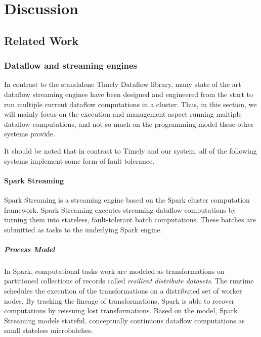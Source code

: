 \chapter{Discussion}\label{ch:discussion}

\section{Related Work}

\subsection{Dataflow and streaming engines}

In contrast to the standalone Timely Dataflow library, many state of the art
dataflow streaming engines have been designed and engineered from the start
to run multiple current dataflow computations in a cluster. Thus, in this
section, we will mainly focus on the execution and management aspect running
multiple dataflow computations, and not so much on the programming model these
other systems provide.

It should be noted that in contrast to Timely and our system, all of the
following systems implement some form of fault tolerance. 

\subsubsection{Spark Streaming}

Spark Streaming \cite{sparkstreaming} is a streaming engine based on the Spark
cluster computation framework. Spark Streaming executes streaming dataflow
computations by turning them into stateless, fault-tolerant batch computations.
These batches are submitted as tasks to the underlying Spark engine. \cite{spark} 

\paragraph{Process Model}

In Spark, computational tasks work are modeled as transformations on partitioned
collections of records called \emph{resilient distribute datasets}. The
runtime schedules the execution of the transformations on a distributed set of
worker nodes. By tracking the lineage of transformations, Spark is able to
recover computations by reissuing lost transformations. Based on the model,
Spark Streaming models stateful, conceptually continuous dataflow computations
as small stateless microbatches.

